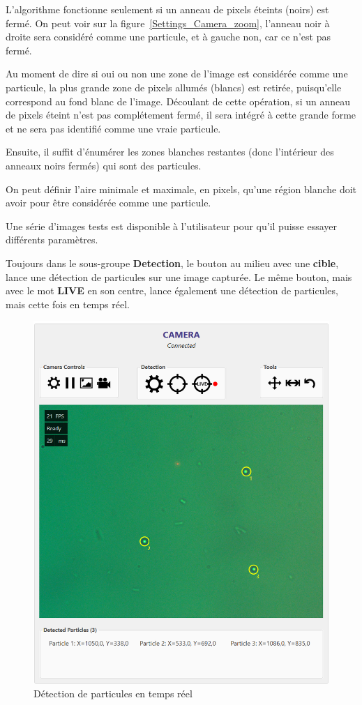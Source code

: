 L'algorithme fonctionne seulement si un anneau de pixels éteints (noirs) est fermé. On peut voir sur la figure~\ref{Settings_Camera_zoom}, l'anneau noir à droite sera considéré comme une particule, et à gauche non, car ce n'est pas fermé.

Au moment de dire si oui ou non une zone de l'image est considérée comme une particule, la plus grande zone de pixels allumés (blancs) est retirée, puisqu'elle correspond au fond blanc de l'image. Découlant de cette opération, si un anneau de pixels éteint n'est pas complétement fermé, il sera intégré à cette grande forme et ne sera pas identifié comme une vraie particule.

Ensuite, il suffit d'énumérer les zones blanches restantes (donc l'intérieur des anneaux noirs fermés) qui sont des particules.

On peut définir l'aire minimale et maximale, en pixels, qu'une région blanche doit avoir pour être considérée comme une particule.

Une série d'images tests est disponible à l'utilisateur pour qu'il puisse essayer différents paramètres.

Toujours dans le sous-groupe \textbf{Detection}, le bouton au milieu avec une \textbf{cible}, lance une détection de particules sur une image capturée. Le même bouton, mais avec le mot \textbf{LIVE} en son centre, lance également une détection de particules, mais cette fois en temps réel.
\newpage
\begin{figure}[H]
    \centering
    \includegraphics[width=\textwidth]{assets/figures/Application_ServoVision/Live_Targeting_Bead.png}
    \caption{Détection de particules en temps réel}
    \label{Live_Targeting_Bead}
\end{figure}

